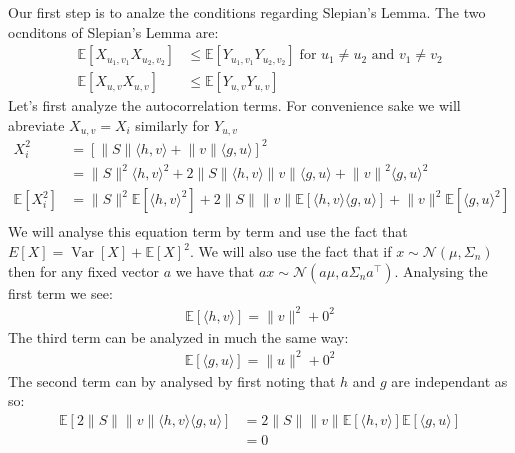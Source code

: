 Our first step is to analze the conditions regarding Slepian's Lemma. The two ocnditons of Slepian's Lemma are:
\begin{align*}
    \mathds{E}\left[X_{u_1,v_1}X_{u_2,v_2}\right] &\leq \mathds{E}\left[ Y_{u_1,v_1}Y_{u_2, v_2}\right] \; \text{for } u_1 \neq u_2 \text{ and } v_1 \neq v_2 \\
    \mathds{E}\left[X_{u,v}X_{u,v}\right] &\leq \mathds{E}\left[ Y_{u,v}Y_{u,v}\right]
\end{align*}
Let's first analyze the autocorrelation terms. For convenience sake we will abreviate $X_{u,v} = X_i$ similarly for
$Y_{u, v}$
\begin{align*}
    X_i^2 &= {\left[ \lVert S \rVert\langle h,v \rangle + \lVert v \rVert \langle g,u \rangle \right]}^2 \\
          &= \lVert S \rVert^2 \langle h,v\rangle^2 + 2\lVert S \rVert\langle h,v\rangle \lVert v \rVert \langle g,u \rangle + {\lVert v \rVert}^2 {\langle g,u \rangle}^2 \\
    \mathds{E}\left[ X_i^2\right] &= \lVert S \rVert^2 \mathds{E}\left[\langle h,v \rangle^2\right] + 2\lVert S \rVert \lVert v \rVert \mathds{E}\left[\langle h,v\rangle \langle g, u\rangle\right] + \lVert v \rVert^2 \mathds{E}\left[\langle g, u\rangle^2\right] \\
\end{align*}
We will analyse this equation term by term and use the fact that $E\left[X\right] = \operatorname{Var}\left[X\right] +
{\mathds{E}\left[X\right]}^2$. We will also use the fact that if $x \sim \mathcal{N}(\mu, \Sigma_n)$ then for any fixed
vector $a$ we have that $ax \sim \mathcal{N}(a\mu, a\Sigma_n a^{\top})$. Analysing the first term we see:
\begin{align*}
    \mathds{E}\left[\langle h, v\rangle\right] = \lVert v \rVert^2 + 0^2
\end{align*}
The third term can be analyzed in much the same way:
\begin{align*}
    \mathds{E}\left[\langle g, u\rangle\right] = \lVert u \rVert^2 + 0^2
\end{align*}
The second term can by analysed by first noting that $h$ and $g$ are independant as so:
\begin{align*}
    \mathds{E}\left[2\lVert S \rVert \lVert v \rVert\langle h,v\rangle \langle g,u \rangle\right] &= 2\lVert S \rVert\lVert v \rVert \mathds{E}\left[\langle h,v \rangle\right]\mathds{E}\left[\langle g,u \rangle\right] \\
                                                                                                  &= 0
\end{align*}

